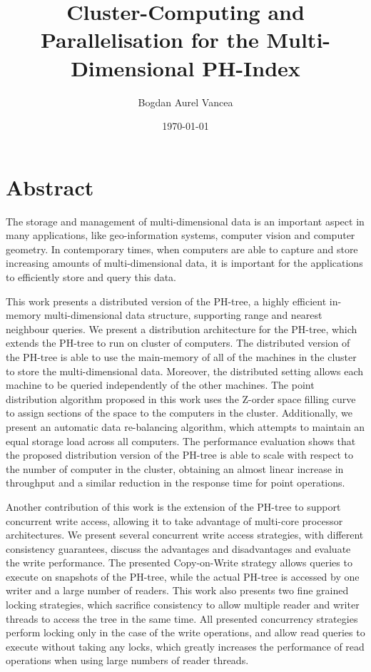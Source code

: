 \documentclass[11pt,a4paper]{globis-book}
\title{Cluster-Computing and Parallelisation for the
    Multi-Dimensional PH-Index}
\author{Bogdan Aurel Vancea}
\institute{Institute of Information Systems}
\date{\today}
\begin{document}
\frontmatter
\maketitlepage
\cleardoublepage
{}

\chapter*{Abstract}

The storage and management of multi-dimensional data is an important aspect in many applications, like geo-information systems, computer vision and computer geometry. In contemporary times, when computers are able to capture and store increasing amounts of multi-dimensional data, it is important for the applications to efficiently store and query this data. 

This work presents a distributed version of the PH-tree, a highly efficient in-memory multi-dimensional data structure, supporting range and nearest neighbour queries. We present a distribution architecture for the PH-tree, which extends the PH-tree to run on cluster of computers. The distributed version of the PH-tree is able to use the main-memory of all of the machines in the cluster to store the multi-dimensional data. Moreover, the distributed setting allows each machine to be queried independently of the other machines. The point distribution algorithm proposed in this work uses the Z-order space filling curve to assign sections of the space to the computers in the cluster. Additionally, we present an automatic data re-balancing algorithm, which attempts to maintain an equal storage load across all computers. The performance evaluation shows that the proposed distribution version of the PH-tree is able to scale with respect to the number of computer in the cluster, obtaining an almost linear increase in throughput and a similar reduction in the response time for point operations. 

Another contribution of this work is the extension of the PH-tree to support concurrent write access, allowing it to take advantage of multi-core processor architectures. We present several concurrent write access strategies, with different consistency guarantees, discuss the advantages and disadvantages and evaluate the write performance. The presented Copy-on-Write strategy allows queries to execute on snapshots of the PH-tree, while the actual PH-tree is accessed by one writer and a large number of readers. This work also presents two fine grained locking strategies, which sacrifice consistency to allow multiple reader and writer threads to access the tree in the same time. All presented concurrency strategies perform locking only in the case of the write operations, and allow read queries to execute without taking any locks, which greatly increases the performance of read operations when using large numbers of reader threads.  
\end{document}

